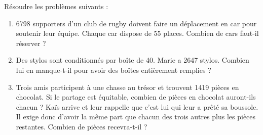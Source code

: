 \begin{exercice*}
   Résoudre les problèmes suivants :
   \begin{enumerate}
      \item \num{6798} supporters d'un club de rugby doivent faire un déplacement en car pour soutenir leur équipe. Chaque car dispose de 55 places. Combien de cars faut-il réserver ?
      \item Des stylos sont conditionnés par boîte de 40. Marie a \num{2647} stylos. Combien lui en manque-t-il pour avoir des boîtes entièrement remplies ?
      \item Trois amis participent à une chasse au trésor et trouvent \num{1419} pièces en chocolat. Si le partage est équitable, combien de pièces en chocolat auront-ils chacun ? Kaïs arrive et leur rappelle que c'est lui qui leur a prêté sa boussole. Il exige donc d'avoir la même part que chacun des trois autres plus les pièces restantes. Combien de pièces recevra-t-il ?
   \end{enumerate}
\end{exercice*}
